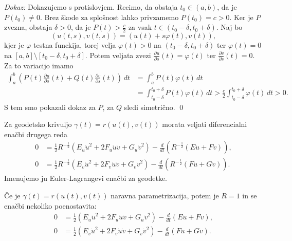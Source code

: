 \noindent
{\em Dokaz:\/}
Dokazujemo s protislovjem. Recimo, da obstaja $t_0 \in (a,b)$, da je $P(t_0) \neq 0$. Brez škode za splošnost lahko privzamemo
$P(t_0) = c > 0$. Ker je $P$ zvezna, obstaja $\delta > 0$, da je $P(t) > \frac{c}{2}$ za vsak $t \in (t_0 - \delta, t_0 + \delta)$. 
Naj bo \begin{equation*}
(u(t,s), v(t,s)) = (u(t) + s \varphi(t), v(t)),
\end{equation*}  
kjer je $\varphi$ testna funckija, torej velja $\varphi(t) > 0$ na $(t_0 - \delta, t_0 + \delta)$ ter $\varphi(t) = 0$ na $[a,b] \setminus [t_0 - \delta, t_0 + \delta]$.
Potem veljata zvezi $\frac{ \partial u }{ \partial s }(t)= \varphi(t)$ ter $\frac{ \partial v }{ \partial s }(t) = 0$.
Za to variacijo imamo
\begin{align*}
    \int_{a}^{b} \left(P(t)\frac{ \partial u }{ \partial s } (t) + Q(t)\frac{ \partial v }{ \partial s } (t)  \right) \, dt &= \int_{a}^{b} P(t) \varphi(t) \, dt     \\
     &= \int_{t_0 - \delta}^{t_0 + \delta} P(t) \varphi(t)  \, dt > \frac{c}{2}  \int_{t_0 - \delta}^{t_0 + \delta} \varphi(t) \, dt > 0.
\end{align*} 
S tem smo pokazali dokaz za $P$, za $Q$ sledi simetrično.
\qed

\begin{posledica}
\label{psl_Euler_Lagrangeevi_enacbi_za_geodetke}
Za geodetsko krivuljo $\gamma(t) = r(u(t), v(t))$ morata veljati diferencialni enačbi drugega reda \begin{align*}
    0 &= \frac{1}{2} R^{-\frac{1}{2}} (E_u \dot{u}^2 + 2F_u \dot{u} \dot{v} + G_u \dot{v}^2) - \frac{d}{dt} (R^{-\frac{1}{2}}(E\dot{u} + F\dot{v})), \\
    0 &= \frac{1}{2} R^{-\frac{1}{2}} (E_v \dot{u}^2 + 2F_v \dot{u} \dot{v} + G_v \dot{v}^2) - \frac{d}{dt} (R^{-\frac{1}{2}}(F\dot{u} + G\dot{v})).
\end{align*}
Imenujemo ju Euler-Lagrangevi enačbi za geodetke.
\end{posledica}


\begin{opomba}
Če je $\gamma(t) = r(u(t), v(t))$ naravna parametrizacija, potem je $R = 1$ in se enačbi nekoliko poenostavita:
\begin{align*}
    0 &= \frac{1}{2} (E_u \dot{u}^2 + 2F_u \dot{u} \dot{v} + G_u \dot{v}^2) - \frac{d}{dt} (E\dot{u} + F\dot{v}), \\
    0 &= \frac{1}{2} (E_v \dot{u}^2 + 2F_v \dot{u} \dot{v} + G_v \dot{v}^2) - \frac{d}{dt} (F\dot{u} + G\dot{v}).
\end{align*}
\end{opomba}

